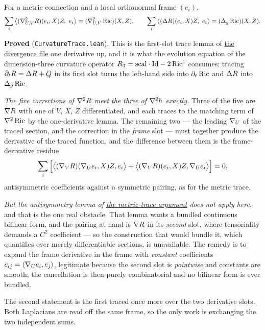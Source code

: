 \begin{lemma}[The first-slot trace commutes with $\nab^2$, and $\mathrm{tr}_1(\Delta\Riem) = \Delta_g\Ric$]
  \label{lem:curvature-trace-second}
  \leanok
  For a metric connection and a local orthonormal frame $(e_i)$,
  \[
    \sum_i \big\langle (\nabla^2_{U,V}R)(e_i,X)Z,\ e_i\big\rangle
      = (\nabla^2_{U,V}\operatorname{Ric})(X,Z),
    \qquad
    \sum_i \big\langle (\Delta R)(e_i,X)Z,\ e_i\big\rangle
      = (\Delta_g\operatorname{Ric})(X,Z).
  \]

  \textbf{Proved} (\texttt{CurvatureTrace.lean}). This is the first-slot trace lemma of
  \hyperref[lem:traced-bianchi]{the divergence file} one derivative up, and it is what the
  evolution equation of the dimension-three curvature operator
  $R_3 = \mathrm{scal}\cdot\mathrm{Id} - 2\operatorname{Ric}^\sharp$ consumes: tracing
  $\partial_tR = \Delta R + Q$ in its first slot turns the left-hand side into
  $\partial_t\operatorname{Ric}$ and $\Delta R$ into $\Delta_g\operatorname{Ric}$.

  \emph{The five corrections of $\nabla^2R$ meet the three of $\nabla^2 h$ exactly.} Three of
  the five are $\nabla R$ with one of $V$, $X$, $Z$ differentiated, and each traces to the
  matching term of $\nabla^2\operatorname{Ric}$ by the one-derivative lemma. The remaining two --- the
  leading $\nabla_U$ of the traced section, and the correction in the \emph{frame} slot ---
  must together produce the derivative of the traced function, and the difference between
  them is the frame-derivative residue
  \[
    \sum_i \Big[\big\langle (\nabla_VR)(\nabla_U e_i, X)Z, e_i\big\rangle
      + \big\langle (\nabla_VR)(e_i,X)Z, \nabla_U e_i\big\rangle\Big] = 0,
  \]
  antisymmetric coefficients against a symmetric pairing, as for the metric trace.

  \emph{But the antisymmetry lemma of \hyperref[lem:metric-trace-cov]{the metric-trace
  argument} does not apply here}, and that is the one real obstacle. That lemma wants a
  bundled continuous bilinear form, and the pairing at hand is $\nabla R$ in its
  \emph{second} slot, where tensoriality demands a $C^2$ coefficient --- so the construction
  that would bundle it, which quantifies over merely differentiable sections, is
  unavailable. The remedy is to expand the frame derivative in the frame with \emph{constant}
  coefficients $c_{ij} = \langle \nabla_U e_i, e_j\rangle$, legitimate because the second slot
  is \emph{pointwise} and constants are smooth; the cancellation is then purely combinatorial
  and no bilinear form is ever bundled.

  The second statement is the first traced once more over the two derivative slots. Both
  Laplacians are read off the same frame, so the only work is exchanging the two independent
  sums.
\end{lemma}

